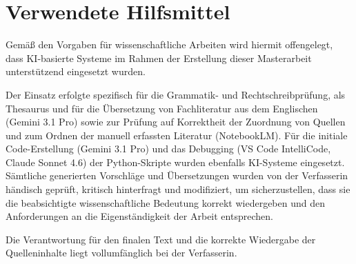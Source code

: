 \chapter{Verwendete Hilfsmittel}

Gemäß den Vorgaben für wissenschaftliche Arbeiten wird hiermit offengelegt, dass KI-basierte Systeme im Rahmen der Erstellung dieser Masterarbeit unterstützend eingesetzt wurden. 

Der Einsatz erfolgte spezifisch für die Grammatik- und Rechtschreibprüfung, als Thesaurus und für die Übersetzung von Fachliteratur aus dem Englischen (Gemini 3.1 Pro) sowie zur Prüfung auf Korrektheit der Zuordnung von Quellen und zum Ordnen der manuell erfassten Literatur (NotebookLM). Für die initiale Code-Erstellung (Gemini 3.1 Pro) und das Debugging (VS Code IntelliCode, Claude Sonnet 4.6) der Python-Skripte wurden ebenfalls KI-Systeme eingesetzt.  Sämtliche generierten Vorschläge und Übersetzungen wurden von der Verfasserin händisch geprüft, kritisch hinterfragt und modifiziert, um sicherzustellen, dass sie die beabsichtigte wissenschaftliche Bedeutung korrekt wiedergeben und den Anforderungen an die Eigenständigkeit der Arbeit entsprechen.

Die Verantwortung für den finalen Text und die korrekte Wiedergabe der Quelleninhalte liegt vollumfänglich bei der Verfasserin.
